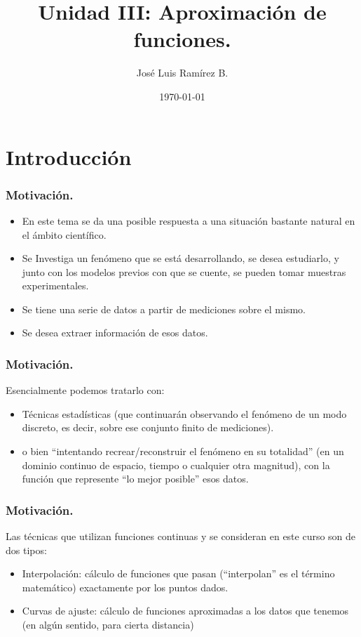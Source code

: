 \documentclass{beamer}
\title{Unidad III: Aproximaci\'on de funciones.}
\author{Jos\'e Luis Ram\'irez B.}
\date{\today}
\begin{document}
\frame{\titlepage}

\frame{\tableofcontents}

\section{Introducci\'on}
\begin{frame}[fragile]
  \frametitle{Motivaci\'on.} 
  \begin{itemize}
   \item<1-> En este tema se da una posible respuesta a una situaci\'on
bastante natural en el \'ambito cient\'ifico.
    \item<2-> Se Investiga un fen\'omeno que se est\'a desarrollando, se desea estudiarlo, y junto
con los modelos previos con que se cuente, se pueden tomar
muestras experimentales.
    \item<3-> Se tiene una serie de datos a partir de
mediciones sobre el mismo.
    \item<4-> Se desea extraer informaci\'on de esos datos.
  \end{itemize}
\end{frame}
\begin{frame}[fragile]
  \frametitle{Motivaci\'on.}
  Esencialmente podemos tratarlo con:
\begin{itemize}
 \item<2-> T\'ecnicas estad\'isticas (que continuar\'an observando el fen\'omeno de un modo discreto, es decir, sobre ese conjunto finito de mediciones).
 \item<3-> o bien ``intentando recrear/reconstruir el fen\'omeno en su totalidad'' (en un dominio continuo de espacio, tiempo o cualquier otra magnitud), con la funci\'on que represente ``lo mejor posible'' esos datos.
\end{itemize}
\end{frame}
\frame
{
  \frametitle{Motivaci\'on.}
Las t\'ecnicas que utilizan funciones continuas y se consideran en este curso son de dos tipos:
\begin{itemize}
 \item<2-> Interpolaci\'on: c\'alculo de funciones que pasan (``interpolan'' es el t\'ermino matem\'atico) exactamente por los puntos dados.
 \item<3-> Curvas de ajuste: c\'alculo de funciones aproximadas a los datos que tenemos (en alg\'un sentido, para cierta distancia)
\end{itemize}
}
\end{document}
